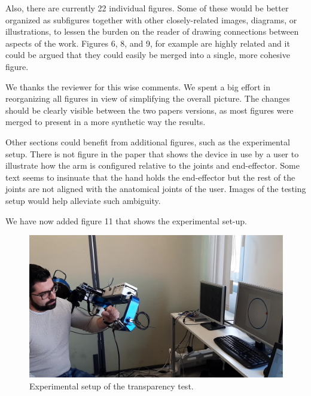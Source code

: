 \begin{point}
 Also, there are currently 22 individual figures.
Some of these would be better organized as subfigures together with
other closely-related images, diagrams, or illustrations, to lessen the
burden on the reader of drawing connections between aspects of the
work. Figures 6, 8, and 9, for example are highly related and it could
be argued that they could easily be merged into a single, more cohesive
figure. 
\end{point}
\begin{reply}
We thanks the reviewer for this wise comments. We spent a big effort in reorganizing all figures in view of simplifying the overall picture. The changes should be clearly visible between the two papers versions, as most figures were merged to present in a more synthetic way the results. 
\end{reply}

\begin{point}
Other sections could benefit from additional figures, such as
the experimental setup. There is not figure in the paper that shows the
device in use by a user to illustrate how the arm is configured
relative to the joints and end-effector. Some text seems to insinuate
that the hand holds the end-effector but the rest of the joints are not
aligned with the anatomical joints of the user. Images of the testing
setup would help alleviate such ambiguity.
\end{point}
\begin{reply}
We have now added figure 11 that shows the experimental set-up.

\begin{figure}[htb]
	\centering
	\includegraphics[width=0.5\columnwidth]{../imgRevised/experiment_setup}
	\caption{Experimental setup of the transparency test.}
	\label{fig:experimentalSetup}
\end{figure}

\end{reply}


